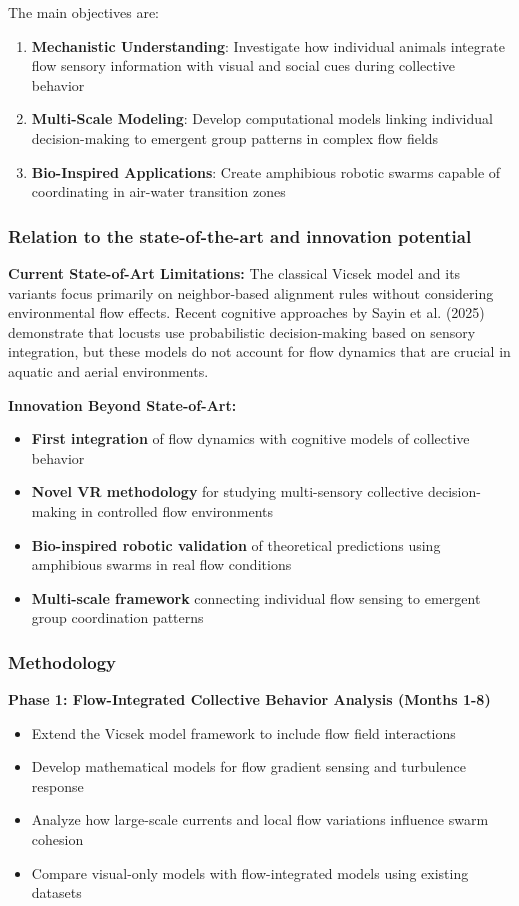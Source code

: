 \documentclass[11pt,a4paper]{article}
\newcommand{\highlight}[1]{\textbf{\color{blue!70!black} #1}}
\begin{document}
The main objectives are:
\begin{enumerate}[noitemsep]
\item \highlight{Mechanistic Understanding}: Investigate how individual animals integrate flow sensory information with visual and social cues during collective behavior
\item \highlight{Multi-Scale Modeling}: Develop computational models linking individual decision-making to emergent group patterns in complex flow fields
\item \highlight{Bio-Inspired Applications}: Create amphibious robotic swarms capable of coordinating in air-water transition zones
\end{enumerate}

\subsubsection{Relation to the state-of-the-art and innovation potential}

\highlight{Current State-of-Art Limitations:}
The classical Vicsek model\cite{vicsek1995} and its variants focus primarily on neighbor-based alignment rules without considering environmental flow effects. Recent cognitive approaches by Sayin et al. (2025)\cite{sayin2025} demonstrate that locusts use probabilistic decision-making based on sensory integration, but these models do not account for flow dynamics that are crucial in aquatic and aerial environments.

\highlight{Innovation Beyond State-of-Art:}
\begin{itemize}[noitemsep]
\item \textbf{First integration} of flow dynamics with cognitive models of collective behavior
\item \textbf{Novel VR methodology} for studying multi-sensory collective decision-making in controlled flow environments
\item \textbf{Bio-inspired robotic validation} of theoretical predictions using amphibious swarms in real flow conditions
\item \textbf{Multi-scale framework} connecting individual flow sensing to emergent group coordination patterns
\end{itemize}

\subsubsection{Methodology}

\highlight{Phase 1: Flow-Integrated Collective Behavior Analysis (Months 1-8)}
\begin{itemize}[noitemsep]
\item Extend the Vicsek model framework to include flow field interactions
\item Develop mathematical models for flow gradient sensing and turbulence response
\item Analyze how large-scale currents and local flow variations influence swarm cohesion
\item Compare visual-only models with flow-integrated models using existing datasets
\end{itemize}
\end{document}

